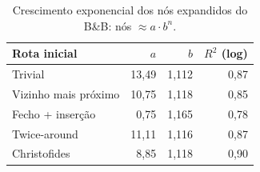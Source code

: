 \begin{table}[htb]
\centering
\caption{Crescimento exponencial dos nós expandidos do B\&B: nós $\approx a\cdot b^n$.}
\label{tab:complexity-nodes}
\small
\setlength{\tabcolsep}{4pt}
\begin{tabular}{lrrr}
\toprule
Rota inicial & $a$ & $b$ & $R^2$ (log) \\
\midrule
Trivial & 13{,}49 & 1{,}112 & 0{,}87 \\
Vizinho mais próximo & 10{,}75 & 1{,}118 & 0{,}85 \\
Fecho + inserção & 0{,}75 & 1{,}165 & 0{,}78 \\
Twice-around & 11{,}11 & 1{,}116 & 0{,}87 \\
Christofides & 8{,}85 & 1{,}118 & 0{,}90 \\
\bottomrule
\end{tabular}
\end{table}
